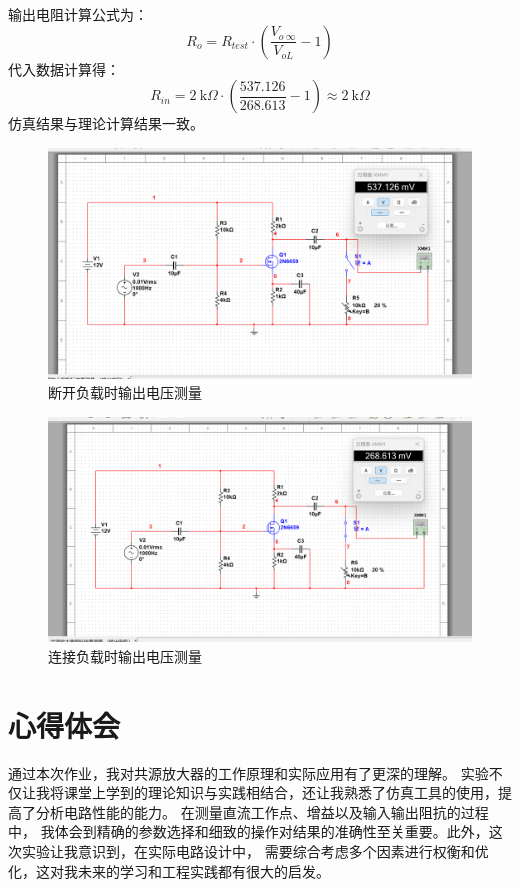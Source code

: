 \documentclass[12p,UTF8]{article}
\begin{document}
\begin{spacing}{1.25}
输出电阻计算公式为：
\[
R_{o} = R_{test} \cdot (\frac{V_{o\ \infty}}{V_{oL}}-1)
\]
代入数据计算得：
\[
R_{in} = 2\ \text{k}\Omega \cdot( \frac{537.126}{268.613}-1)  \approx 2\ \text{k}\Omega
\]
仿真结果与理论计算结果一致。
\FloatBarrier
\begin{figure}[H]
  \centering
  \includegraphics[width=1\linewidth]{5.png}
  \caption{断开负载时输出电压测量}
  \label{fig:circuit}
\end{figure}
\begin{figure}[H]
  \centering
  \includegraphics[width=1\linewidth]{6.png}
  \caption{连接负载时输出电压测量}
  \label{fig:circuit}
\end{figure}


\section{心得体会}
通过本次作业，我对共源放大器的工作原理和实际应用有了更深的理解。
实验不仅让我将课堂上学到的理论知识与实践相结合，还让我熟悉了仿真工具的使用，提高了分析电路性能的能力。
在测量直流工作点、增益以及输入输出阻抗的过程中，
我体会到精确的参数选择和细致的操作对结果的准确性至关重要。此外，这次实验让我意识到，在实际电路设计中，
需要综合考虑多个因素进行权衡和优化，这对我未来的学习和工程实践都有很大的启发。

\end{spacing}
\end{document}
